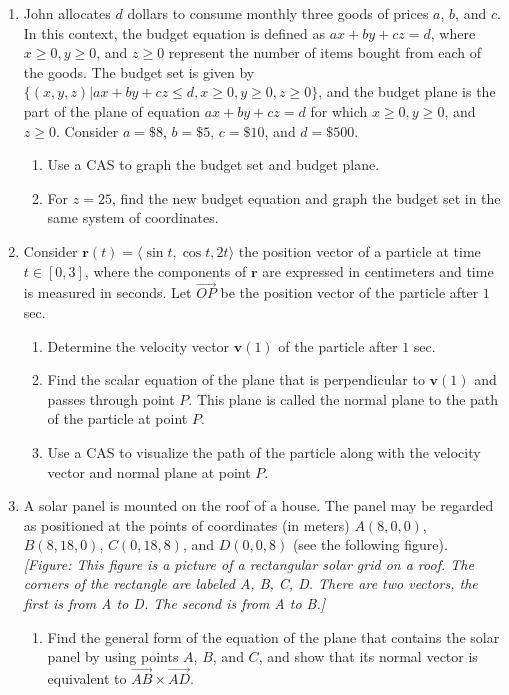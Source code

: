 \documentclass{exercises}
\begin{document}
\begin{enumerate}[resume]
\item \techrequired John allocates $d$ dollars to consume monthly three goods of prices $a$, $b$, and $c$. In this context, the budget equation is defined as $ax+by+cz=d$, where $x\ge0,y\ge0$, and $z\ge0$ represent the number of items bought from each of the goods. The budget set is given by $\{(x,y,z)|ax+by+cz\le d,x\ge0,y\ge0,z\ge0\}$, and the budget plane is the part of the plane of equation $ax+by+cz=d$ for which $x\ge0,y\ge0$, and $z\ge0$. Consider $a=\$8$, $b=\$5$, $c=\$10$, and $d=\$500$.
\begin{enumerate}[label=(\alph*)]
  \item Use a CAS to graph the budget set and budget plane.
  \item For $z=25$, find the new budget equation and graph the budget set in the same system of coordinates.
\end{enumerate}
\item \techrequired Consider $\mathbf{r}(t)=\langle \sin t,\cos t,2t\rangle$ the position vector of a particle at time $t\in[0,3]$, where the components of $\mathbf{r}$ are expressed in centimeters and time is measured in seconds. Let $\overset{\to}{OP}$ be the position vector of the particle after $1$ sec.
\begin{enumerate}[label=(\alph*)]
  \item Determine the velocity vector $\mathbf{v}(1)$ of the particle after $1$ sec.
  \item Find the scalar equation of the plane that is perpendicular to $\mathbf{v}(1)$ and passes through point $P$. This plane is called the normal plane to the path of the particle at point $P$.
  \item Use a CAS to visualize the path of the particle along with the velocity vector and normal plane at point $P$.
\end{enumerate}
\item \techrequired A solar panel is mounted on the roof of a house. The panel may be regarded as positioned at the points of coordinates (in meters) $A(8,0,0)$, $B(8,18,0)$, $C(0,18,8)$, and $D(0,0,8)$ (see the following figure). \\ \textit{[Figure: This figure is a picture of a rectangular solar grid on a roof. The corners of the rectangle are labeled A, B, C, D. There are two vectors, the first is from A to D. The second is from A to B.]}
\begin{enumerate}[label=(\alph*)]
  \item Find the general form of the equation of the plane that contains the solar panel by using points $A$, $B$, and $C$, and show that its normal vector is equivalent to $\overset{\to}{AB}\times \overset{\to}{AD}$.

\end{enumerate}
\end{enumerate}
\end{document}
